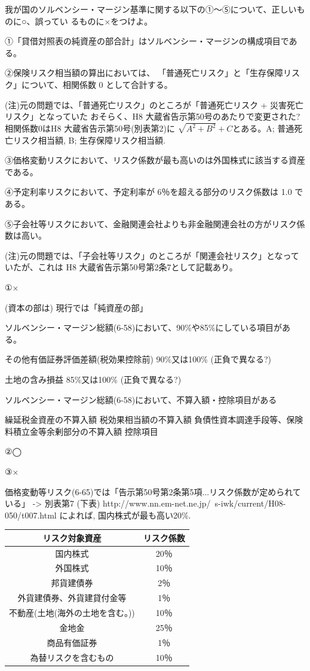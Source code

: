 \documentclass[report,gutter=10mm,fore-edge=10mm,uplatex,dvipdfmx]{jlreq}
\begin{document}
我が国のソルベンシー・マージン基準に関する以下の①～⑤について、正しいものに○、誤ってい
るものに×をつけよ。

①「貸借対照表の純資産の部合計」はソルベンシー・マージンの構成項目である。

②保険リスク相当額の算出においては、
「普通死亡リスク」と「生存保障リスク」について、相関係数 0 として合計する。

(注)元の問題では、「普通死亡リスク」のところが「普通死亡リスク + 災害死亡リスク」となっていた
おそらく、H8 大蔵省告示第50号のあたりで変更された?
相関係数0はH8 大蔵省告示第50号(別表第2)に $\sqrt{A^2+B^2}+C$とある。A; 普通死亡リスク相当額, B; 生存保障リスク相当額.

③価格変動リスクにおいて、リスク係数が最も高いのは外国株式に該当する資産である。

④予定利率リスクにおいて、予定利率が 6％を超える部分のリスク係数は 1.0 である。

⑤子会社等リスクにおいて、金融関連会社よりも非金融関連会社の方がリスク係数は高い。

(注)元の問題では、「子会社等リスク」のところが「関連会社リスク」となっていたが、これは H8 大蔵省告示第50号第2条7として記載あり。


\answer{}

①×

(資本の部は) 現行では「純資産の部」

ソルベンシー・マージン総額(6-58)において、90\%や85\%にしている項目がある。

その他有価証券評価差額(税効果控除前) 90\%又は100\% (正負で異なる?)

土地の含み損益 85\%又は100\% (正負で異なる?)

ソルベンシー・マージン総額(6-58)において、不算入額・控除項目がある

繰延税金資産の不算入額
税効果相当額の不算入額
負債性資本調達手段等、保険料積立金等余剰部分の不算入額
控除項目

②◯

③×

価格変動等リスク(6-65)では「告示第50号第2条第5項...リスク係数が定められている」
-> 別表第7 (下表) http://www.nn.em-net.ne.jp/~s-iwk/current/H08-050/t007.html
によれば, 国内株式が最も高い20\%.

\begin{tabular}{|c|c|}
 \hline
リスク対象資産&リスク係数 \\ 
 \hline
国内株式	& 20％\\
外国株式	& 10％\\
邦貨建債券	& 2％\\
外貨建債券、外貨建貸付金等	& 1％\\
不動産(土地(海外の土地を含む。))  &	10％\\
金地金	& 25％\\
商品有価証券	& 1％\\
為替リスクを含むもの	& 10％\\
\hline
\end{tabular}
\end{document}
